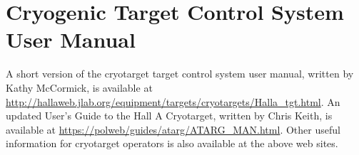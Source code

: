 \section[Cryogenic Target Control System User Manual]
{Cryogenic Target Control System User Manual 
}
A short version of 
the cryotarget target control system user manual, written by Kathy 
McCormick, is available at
\url{http://hallaweb.jlab.org/equipment/targets/cryotargets/Halla_tgt.html}.
An updated User's Guide to the Hall A Cryotarget, written by Chris Keith,
is available at \url{https://polweb/guides/atarg/ATARG_MAN.html}.  Other useful
information for cryotarget operators 
is also available at the above web sites.



%
 
%
%
%
%
%
%
%
%
%
%
%
%
%
%
%
%
%



